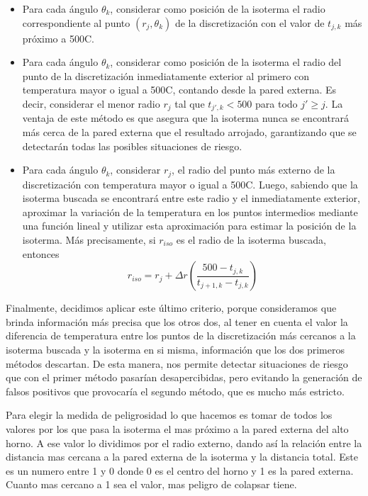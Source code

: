 \documentclass[11pt, a4paper, spanish]{article}
\theoremstyle{plain}
\theoremstyle{remark}
\begin{document}
    \begin{itemize}
      \item Para cada ángulo $\theta_k$, considerar como posición de la isoterma el radio correspondiente al punto $(r_j, \theta_k)$ de la discretización con el valor de $t_{j,k}$ más próximo a 500{\degree}C.
      \item Para cada ángulo $\theta_k$, considerar como posición de la isoterma el radio del punto de la discretización inmediatamente exterior al primero con temperatura mayor o igual a 500{\degree}C, contando desde la pared externa. Es decir, considerar el menor radio $r_j$ tal que $t_{j',k} < 500$ para todo $j' \geq j$. La ventaja de este método es que asegura que la isoterma nunca se encontrará más cerca de la pared externa que el resultado arrojado, garantizando que se detectarán todas las posibles situaciones de riesgo.
      \item Para cada ángulo $\theta_k$, considerar $r_j$, el radio del punto más externo de la discretización con temperatura mayor o igual a 500{\degree}C. Luego, sabiendo que la isoterma buscada se encontrará entre este radio y el inmediatamente exterior, aproximar la variación de la temperatura en los puntos intermedios mediante una función lineal y utilizar esta aproximación para estimar la posición de la isoterma. Más precisamente, si $r_{iso}$ es el radio de la isoterma buscada, entonces
        \[ r_{iso} = r_j + \Delta r \left(\frac{500 - t_{j,k}}{t_{j+1,k} - t_{j,k}} \right) \]
    \end{itemize}

    Finalmente, decidimos aplicar este último criterio, porque consideramos que brinda información más precisa que los otros dos, al tener en cuenta el valor la diferencia de temperatura entre los puntos de la discretización más cercanos a la isoterma buscada y la isoterma en si misma, información que los dos primeros métodos descartan. De esta manera, nos permite detectar situaciones de riesgo que con el primer método pasarían desapercibidas, pero evitando la generación de falsos positivos que provocaría el segundo método, que es mucho más estricto.

    Para elegir la medida de peligrosidad lo que hacemos es tomar de todos los valores por los que pasa la isoterma el mas próximo a la pared externa del alto horno. A ese valor lo dividimos por el radio externo, dando así la relación entre la distancia mas cercana a la pared externa de la isoterma y la distancia total.
    Este es un numero entre 1 y 0 donde 0 es el centro del horno y 1 es la pared externa. Cuanto mas cercano a 1 sea el valor, mas peligro de colapsar tiene. 
\end{document}
